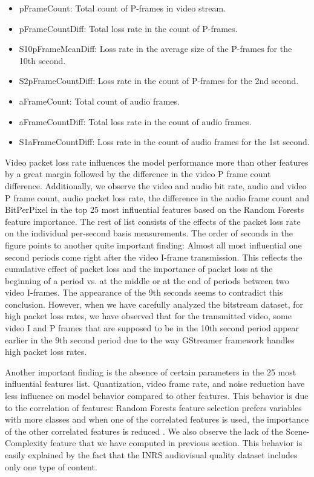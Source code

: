 \documentclass[journal]{IEEEtran}
\begin{document}
\begin{itemize}

\item pFrameCount: Total count of P-frames in video stream.

\item pFrameCountDiff: Total loss rate in the count of P-frames.

\item S10pFrameMeanDiff: Loss rate in the average size of the P-frames for the 10th second.

\item S2pFrameCountDiff: Loss rate in the count of P-frames for the 2nd second.

\item aFrameCount: Total count of audio frames.

\item aFrameCountDiff: Total loss rate in the count of audio frames.

\item S1aFrameCountDiff: Loss rate in the count of audio frames for the 1st second.

\end{itemize}

Video packet loss rate influences the model performance more than other features by a great margin followed by the difference in the video P frame count difference. Additionally, we observe the video and audio bit rate, audio and video P frame count, audio packet loss rate, the difference in the audio frame count and BitPerPixel in the top 25 most influential features based on the Random Forests feature importance.  The rest of list consists of the effects of the packet loss rate on the individual per-second basis measurements. The order of seconds in the figure points to another quite important finding: Almost all most influential one second periods come right after the video I-frame transmission. This reflects the cumulative effect of packet loss and the importance of packet loss at the beginning of a period vs. at the middle or at the end of periods between two video I-frames. The appearance of the 9th seconds seems to contradict this conclusion. However, when we have carefully analyzed the bitstream dataset, for high packet loss rates, we have observed that for the transmitted video, some video I and P frames that are supposed to be in the 10th second period appear earlier in the 9th second period due to the way GStreamer framework handles high packet loss rates.

Another important finding is the absence of certain parameters in the 25 most influential features list. Quantization, video frame rate, and noise reduction have less influence on model behavior compared to other features. This behavior is due to the correlation of features: Random Forests feature selection prefers variables with more classes and when one of the correlated features is used, the importance of the other correlated features is reduced \cite{strobl2007bias}. We also observe the lack of the Scene-Complexity feature that we have computed in previous section. This behavior is easily explained by the fact that the INRS audiovisual quality dataset includes only one type of content.
\end{document}

